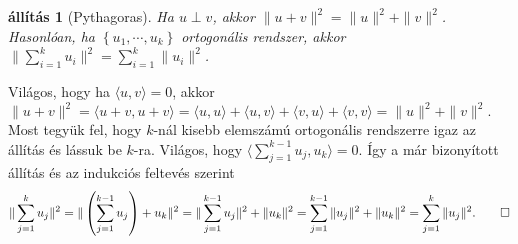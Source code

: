 \documentclass[9pt, a4paper, showtrims]{memoir}
\makeatletter
\renewenvironment{proof}[1][\proofname]
    {\par\pushQED{\qed}%
    \normalfont \topsep6\p@\@plus6\p@\relax
    \trivlist
    \item[\hskip\labelsep
        \itshape
    #1\@addpunct{:}]\ignorespaces}
    {\popQED\endtrivlist\@endpefalse}
\theoremstyle{plain}
\newtheorem{proposition}{állítás}[chapter]
\theoremstyle{remark}
\theoremstyle{definition}
\newcommand{\ip}[2]{\langle#1,#2\rangle}
\makeatother
\begin{document}
\begin{proposition}[Pythagoras]
    Ha $u\perp v$, akkor $\|u+v\|^2=\|u\|^2+\|v\|^2$.
    Hasonlóan, ha $\left\{ u_1,\cdots,u_k \right\}$ ortogonális rendszer, akkor
    $\|\sum_{i=1}^ku_i\|^2=\sum_{i=1}^k\|u_i\|^2$.
\end{proposition}
\begin{proof}
    Világos, hogy ha $\ip{u}{v}=0$, 
    akkor 
    \begin{math}
        \|u+v\|^2
        =
        \ip{u+v}{u+v}
        =\ip{u}{u}+\ip{u}{v}+\ip{v}{u}+\ip{v}{v}
        =
        \|u\|^2+\|v\|^2.
    \end{math}
    Most tegyük fel, hogy $k$-nál kisebb elemszámú ortogonális rendszerre igaz az állítás
    és lássuk be $k$-ra.
    Világos, hogy 
    \begin{math}
        \ip{\sum_{j=1}^{k-1}u_j}{u_k}=0.
    \end{math}
    Így a már bizonyított állítás és az indukciós feltevés szerint
    \[
        \|\sum_{j=1}^ku_j\|^2
        =
        \|\left( \sum_{j=1}^{k-1}u_j \right)+u_k\|^2
        =
        \|\sum_{j=1}^{k-1}u_j\|^2+\|u_k\|^2
        =
        \sum_{j=1}^{k-1}\|u_j\|^2+\|u_k\|^2
        =
        \sum_{j=1}^k\|u_j\|^2.
        \qedhere
    \]
\end{proof}
\end{document}
